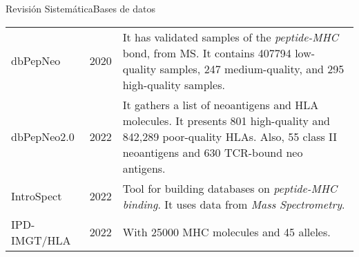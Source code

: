\documentclass[10pt]{beamer}
\newcommand{\1}{
	\setbeamertemplate{background}{
		\texttt{[image: img/1]}
		\tikz[overlay] \fill[fill opacity=0.75,fill=white] (0,0) rectangle (-\paperwidth,\paperheight);
	}
}
\begin{document}
\begin{frame}{Revisión Sistemática}{Bases de datos}
\begin{table}[]
{\begin{tabular}{p{1.7cm}p{1.2cm}p{6.5cm}}
				dbPepNeo        & 2020 \cite{tan2020dbpepneo}                                          & It has validated samples of the \textit{peptide-MHC} bond, from MS. It contains 407794 low-quality samples, 247 medium-quality, and 295 high-quality samples.
				\\
				dbPepNeo2.0    & 2022 \cite{lu2022dbpepneo2}                                          &
				It gathers a list of neoantigens and HLA molecules. It presents 801 high-quality and 842,289 poor-quality HLAs. Also, 55 class II neoantigens and 630 TCR-bound neo antigens.
				\\
				IntroSpect      & 2022 \cite{zhang2022introspect}                                      & Tool for building databases on \textit{peptide-MHC binding}. It uses data from \textit{Mass Spectrometry}.   \\
				
				IPD-IMGT/HLA & 2022 \cite{robinson2020ipd}    &    With 25000 MHC molecules and 45 alleles.                                                                
			\end{tabular}
		}
	\end{table}	
\end{frame}
\end{document}
